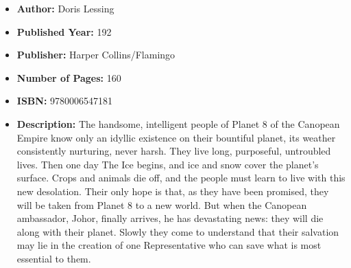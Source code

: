\documentclass{tufte-handout}
\begin{document}
\begin{itemize}
    \item[] \textbf{Author:} Doris Lessing
    \item[] \textbf{Published Year:} 192  
    \item[] \textbf{Publisher:} Harper Collins/Flamingo
    \item[] \textbf{Number of Pages:} 160      
    \item[] \textbf{ISBN:} 9780006547181
    \item[] \textbf{Description:} The handsome, intelligent people of Planet 8 of the Canopean Empire know only an idyllic existence on their bountiful planet, its weather consistently nurturing, never harsh. They live long, purposeful, untroubled lives. Then one day The Ice begins, and ice and snow cover the planet’s surface. Crops and animals die off, and the people must learn to live with this new desolation. Their only hope is that, as they have been promised, they will be taken from Planet 8 to a new world. But when the Canopean ambassador, Johor, finally arrives, he has devastating news: they will die along with their planet. Slowly they come to understand that their salvation may lie in the creation of one Representative who can save what is most essential to them.
\end{itemize}
\end{document}
